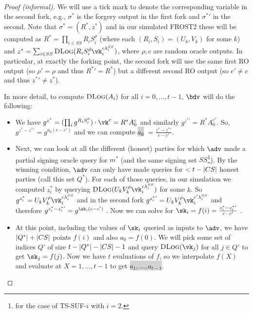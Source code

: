 \begin{proof}[Proof (informal)]
We will use a tick mark to denote the corresponding variable in the second fork, e.g., $\sigma^*$ is the forgery output in the first fork and ${\sigma^*}'$ in the second. Note that $\sigma^* = (R^*, z^*)$ and in our simulated FROST2 these will be computed as $R^* = \prod_{i \in SS} R_i S_i^\rho$ (where each $(R_i, S_i) = (U_k, V_k)$ for some $k$) and $z^* = \sum_{i \in SS} \textsc{DLog}(R_i S_i^d \vk_i^{c \lambda_i^{SS}})$, where $\rho, c$ are random oracle outputs. In particular, at exactly the forking point, the second fork will use the same first RO output (so $\rho' = \rho$ and thus ${R^*}' = R^*$) but a different second RO output (so $c' \neq c$ and thus ${z^*}' \neq z^*$).

In more detail, to compute $\textsc{DLog}(A_i)$ for all $i=0, \dots, t-1$, $\bdv$ will do the following:
\begin{itemize}
    \item We have $g^{z^*} = (\prod_i g^{R_i S_i^\rho}) \cdot \vk^c = R^* A_0^c$ and similarly $g^{{z^*}'} = R^* A_0^{c'}$. So, $g^{z^* - {z^*}'} = g^{a_0 (c-c')}$ and we can compute \colorbox{lightgray}{$a_0$} $= \frac{z^* - {z^*}'}{c - c'}$.
    \item Next, we can look at all the different (honest) parties for which $\adv$ made a partial signing oracle query for $m^*$ (and the same signing set $SS$\footnote{for the case of TS-SUF-$i$ with $i=2$.}). By the winning condition, $\adv$ can only have made queries for $< t-\lvert CS \rvert$ honest parties (call this set $Q^*$). For each of those queries, in our simulation we computed $z_i^*$ by querying $\textsc{DLog}(U_k V_k^\rho \vk_i^{c \lambda_i^{SS}})$ for some $k$. So $g^{z_i^*} = U_k V_k^\rho \vk_i^{c \lambda_i^{SS}}$ and in the second fork $g^{{z_i^*}'} = U_k V_k^\rho \vk_i^{c' \lambda_i^{SS}}$ and therefore $g^{z_i^* - {z_i^*}'} = g^{\sk_i (c-c')}$ . Now we can solve for $\sk_i = f(i) = \frac{z_i^* - {z_i^*}'}{c-c'}$ .
    \item At this point, including the values of $\sk_i$ queried as inputs to $\adv$, we have $\lvert Q^* \rvert + \lvert {\ensuremath{CS}} \rvert$ points $f(i)$ and also $a_0 = f(0)$. We will pick some set of indices $Q'$ of size $t - \lvert Q^* \rvert - \lvert {\ensuremath{CS}} \rvert - 1$ and query $\textsc{DLog}(\vk_{j})$ for all $j \in Q'$ to get $\sk_j = f(j)$. Now we have $t$ evaluations of $f$, so we interpolate $f(X)$ and evaluate at $X = 1, \dots, t-1$ to get \colorbox{lightgray}{$a_1, \dots, a_{t-1}$}.
\end{itemize}


\end{proof}
